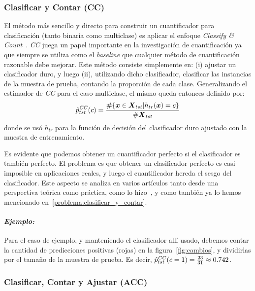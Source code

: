\subsubsection{Clasificar y Contar (CC)}\label{estimacion:cc}

El método más sencillo y directo para construir un cuantificador para
clasificación (tanto binaria como multiclase) es aplicar el enfoque {\it
Classify \& Count\/}~\cite{forman2005counting}. {\it CC\/} juega un papel
importante en la investigación de cuantificación ya que siempre se utiliza como
el {\it baseline\/} que cualquier método de cuantificación razonable debe
mejorar. Este método consiste simplemente en: (i) ajustar un clasificador duro,
y luego (ii), utilizando dicho clasificador, clasificar las instancias de la
muestra de prueba, contando la proporción de cada clase. Generalizando el
estimador de {\it CC\/} para el caso multiclase, el mismo queda entonces
definido por:
\begin{equation}
    \hat p^{\it CC\/}_{tst}(c) = \frac{\#\{\boldsymbol{x} \in \boldsymbol{X}_{tst}|h_{tr}(\boldsymbol{x})=c\}}{\#\boldsymbol{X}_{tst}}\label{ecuacion:cc}
\end{equation}
donde se usó \(h_{tr}\) para la función de decisión del clasificador duro
ajustado con la muestra de entrenamiento.

Es evidente que podemos obtener un cuantificador perfecto si el clasificador es
también perfecto. El problema es que obtener un clasificador perfecto es casi
imposible en aplicaciones reales, y luego el cuantificador hereda el sesgo del
clasificador. Este aspecto se analiza en varios artículos tanto desde una
perspectiva teórica como práctica, como lo hizo~\citet{forman2008quantifying}, y
como también ya lo hemos mencionado en~\ref{problema:clasificar_y_contar}.

\paragraph{\it Ejemplo:\/} Para el caso de ejemplo, y manteniendo el
clasificador allí usado, debemos contar la cantidad de predicciones positivas
(rojas) en la figura~\ref{fig:cambios}, y dividirlas por el tamaño de la muestra
de prueba. Es decir, \(\hat p^{\it CC\/}_{tst}(c=1) = \frac{23}{31} \approx
0.742\).

\subsubsection{Clasificar, Contar y Ajustar (ACC)}\label{estimacion:acc}

